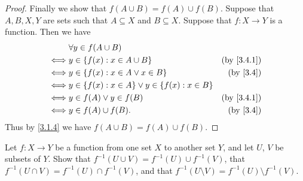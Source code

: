 \begin{proof}
  Finally we show that \(f(A \cup B) = f(A) \cup f(B)\).
  Suppose that \(A, B, X, Y\) are sets such that \(A \subseteq X\) and \(B \subseteq X\).
  Suppose that \(f : X \to Y\) is a function.
  Then we have
  \begin{align*}
         & \forall y \in f(A \cup B)                                                         \\
    \iff & y \in \{f(x) : x \in A \cup B\}                        & \text{(by \cref{3.4.1})} \\
    \iff & y \in \{f(x) : x \in A \lor x \in B\}                  & \text{(by \cref{3.4})}   \\
    \iff & y \in \{f(x) : x \in A\} \lor y \in \{f(x) : x \in B\}                            \\
    \iff & y \in f(A) \lor y \in f(B)                             & \text{(by \cref{3.4.1})} \\
    \iff & y \in f(A) \cup f(B).                                  & \text{(by \cref{3.4})}
  \end{align*}
  Thus by \cref{3.1.4} we have \(f(A \cup B) = f(A) \cup f(B)\).
\end{proof}

\begin{ex}\label{ex:3.4.4}
  Let \(f : X \to Y\) be a function from one set \(X\) to another set \(Y\), and let \(U\), \(V\) be subsets of \(Y\). Show that \(f^{-1}(U \cup V) = f^{-1}(U) \cup f^{-1}(V)\), that
  \(f^{-1}(U \cap V) = f^{-1}(U) \cap f^{-1}(V)\), and that \(f^{-1}(U \setminus V) = f^{-1}(U) \setminus f^{-1}(V)\).
\end{ex}

